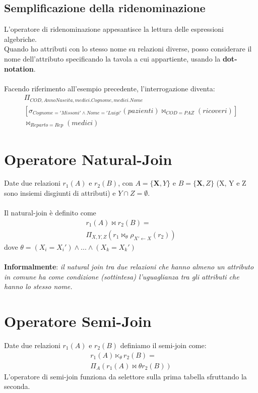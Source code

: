 \subsection{Semplificazione della ridenominazione}
L'operatore di ridenominazione appesantisce la lettura delle espressioni algebriche.\\
Quando ho attributi con lo stesso nome su relazioni diverse, posso considerare il nome dell'attributo specificando la tavola a cui appartiente, usando la \textbf{dot-notation}.\\\\
Facendo riferimento all'esempio precedente, l'interrogazione diventa:
    \begin{equation}\begin{aligned}
        \Pi_{COD, AnnoNascita, medici.Cognome, medici.Nome}\\
        [\sigma_{Cognome = 'Missoni' \wedge Nome = 'Luigi'} (pazienti) \bowtie_{COD = PAZ} (ricoveri)]\\
        \bowtie_{Reparto = Rep} (medici) 
    \end{aligned}\end{equation}
    
\section{Operatore Natural-Join}
Date due relazioni $r_1(A)$ e $r_2(B)$, con 
$A = \{\textbf{X}, Y \}$ e 
$B = \{\textbf{X}, Z \}$ (X, Y e Z sono insiemi disgiunti di attributi) e $Y \cap Z = \emptyset$.\\\\
Il natural-join è definito come
    \begin{equation}\begin{aligned}
        r_1(A) \bowtie r_2(B) = \\
        \Pi_{X, Y, Z} (r_1 \bowtie_{\theta} 
        \rho_{X' \leftarrow X}(r_2))
    \end{aligned}\end{equation}
dove $\theta = (X_i = X_i') \wedge ... \wedge (X_k = X_k')$\\\\
\textbf{Informalmente}: \textit{il natural join tra due relazioni che hanno almeno un attributo in comune ha come condizione (sottintesa) l'uguaglianza tra gli attributi che hanno lo stesso nome.}

\section{Operatore Semi-Join}
Date due relazioni $r_1(A)$ e $r_2(B)$ definiamo il semi-join come:
    \begin{equation}\begin{aligned}
        r_1(A) \ltimes_{\theta} r_2(B) = \\
        \Pi_{A} (r_1(A) \bowtie{\theta} r_2(B))
    \end{aligned}\end{equation}
L'operatore di semi-join funziona da selettore sulla prima tabella sfruttando la seconda.

